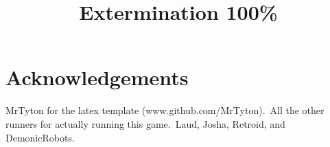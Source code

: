 \documentclass{report}
\title{Extermination 100\%}
\begin{document}
    \singlespacing
    \maketitle
    \tableofcontents

    \section*{Acknowledgements}
        MrTyton for the latex template (www.github.com/MrTyton).\
        All the other runners for actually running this game.\
        Laud, Josha, Retroid, and DemonicRobots.

    \newenvironment{subregion}[1]{\begin{tcolorbox}[title=\begin{center}#1\end{center},colbacktitle=black!75!white]}{\end{tcolorbox}}
\end{document}

